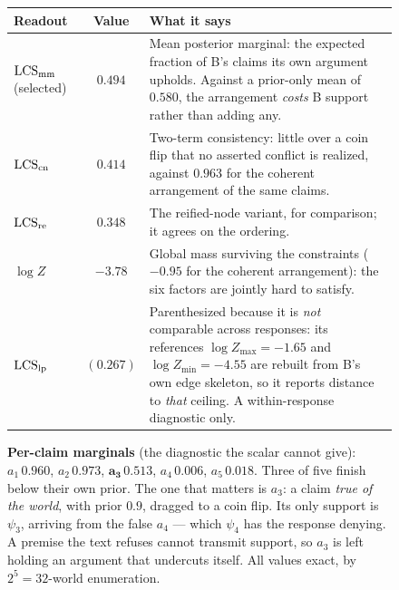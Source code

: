 \begin{figure}[tbp]
\medskip
\ifdefined\rbnocaption\else
\begin{tabularx}{\textwidth}{@{}l@{\hspace{7pt}}c@{\hspace{7pt}}X@{}}
\toprule
Readout & Value & What it says \\
\midrule
$\mathrm{LCS}_{\mathrm{mm}}$ (selected) & $\mathbf{0.494}$
  & Mean posterior marginal: the expected fraction of B's claims its own argument
    upholds. Against a prior-only mean of $0.580$, the arrangement \emph{costs}
    B support rather than adding any. \\
$\mathrm{LCS}_{\mathrm{cn}}$ & $0.414$
  & Two-term consistency: little over a coin flip that no asserted conflict is
    realized, against $0.963$ for the coherent arrangement of the same claims. \\
$\mathrm{LCS}_{\mathrm{re}}$ & $0.348$
  & The reified-node variant, for comparison; it agrees on the ordering. \\
$\log Z$ & $-3.78$
  & Global mass surviving the constraints ($-0.95$ for the coherent
    arrangement): the six factors are jointly hard to satisfy. \\
\midrule
$\mathrm{LCS}_{\mathrm{lp}}$ & $(0.267)$
  & Parenthesized because it is \emph{not} comparable across responses: its
    references $\log Z_{\max}=-1.65$ and $\log Z_{\min}=-4.55$ are rebuilt from
    B's own edge skeleton, so it reports distance to \emph{that} ceiling. A
    within-response diagnostic only. \\
\bottomrule
\end{tabularx}

\smallskip
{\footnotesize\raggedright
\textbf{Per-claim marginals} (the diagnostic the scalar cannot give):
$a_1\,0.960$, $a_2\,0.973$, $\mathbf{a_3\,0.513}$, $a_4\,0.006$, $a_5\,0.018$.
Three of five finish below their own prior. The one that matters is $a_3$: a claim
\emph{true of the world}, with prior $0.9$, dragged to a coin flip. Its only support
is $\psi_3$, arriving from the false $a_4$ --- which $\psi_4$ has the response
denying. A premise the text refuses cannot transmit support, so $a_3$ is left
holding an argument that undercuts itself. All values exact, by $2^5{=}32$-world
enumeration.\par}


\end{figure}
